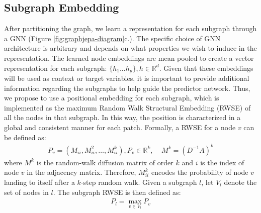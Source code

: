 \documentclass{article} \usepackage{iclr2024_conference,times}
\begin{document}
\subsection{Subgraph Embedding} \label{met:rwse}
After partitioning the graph, we learn a representation for each subgraph through a GNN (Figure \ref{fig:graphjepa-diagram}c.). The specific choice of GNN architecture is arbitrary and depends on what properties we wish to induce in the representation. The learned node embeddings are mean pooled to create a vector representation for each subgraph: $\{h_1 ... h_p\}, h \in \mathbb{R}^d$. Given that these embeddings will be used as context or target variables, it is important to provide additional information regarding the subgraphs to help guide the predictor network. Thus, we propose to use a positional embedding for each subgraph, which is implemented as the maximum Random Walk Structural Embedding (RWSE) of all the nodes in that subgraph. In this way, the position is characterized in a global and consistent manner for each patch. Formally, a RWSE \citep{dwivedi2021graph} for a node $v$ can be defined as:
\begin{gather} \label{eq:rwse}
    P_v = (M_{ii}, M^2_{ii}, \ldots, M^k_{ii}), P_v \in \mathbb{R}^k,~~~~~M^k=(D^{-1}A)^k
\end{gather}
where $M^k$ is the random-walk diffusion matrix of order $k$ and $i$ is the index of node $v$ in the adjacency matrix. Therefore, $M^k_{ii}$ encodes the probability of node $v$ landing to itself after a $k$-step random walk. Given a subgraph $l$, let $V_l$ denote the set of nodes in $l$. The subgraph RWSE is then defined as:
\begin{gather}
    P_l = \max\limits_{v \in V_l}  P_v
\end{gather} 
\end{document}

